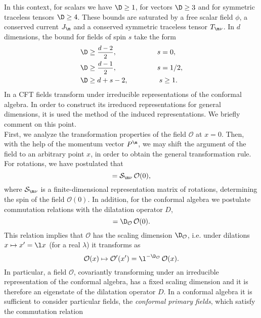 \documentclass[a4paper,11pt,openright,twoside]{book}
\let\n=\nu      \let\x=\xi     \let\p=\pi      \let\r=\rho
\newcommand{\sdfrac}[2]{\mbox{\small$\displaystyle\frac{#1}{#2}$}}
\numberwithin{equation}{section}
\begin{document}
In this context, for scalars we have $\D\ge1$, for vectors $\D\ge3$ and for symmetric traceless tensors $\D\ge4$. These bounds are saturated by a free scalar field $\phi$, a conserved current $J_\m$ and a conserved symmetric traceless tensor $T_{\m\n}$. In $d$ dimensions, the bound for fields of spin $s$ take the form
\begin{align}
	&\D\ge \sdfrac{d-2}{2},\hspace{2cm} s=0,\\
	&\D\ge \sdfrac{d-1}{2},\hspace{2cm} s=1/2,\\
	&\D\ge d+s-2,\hspace{1.53cm} s\ge1.
\end{align}
In a CFT fields transform under irreducible representations of the conformal algebra. In order to construct its irreduced representations for general dimensions, it is used the method of the {induced representations}. We briefly comment on this point.\\
First, we analyze the transformation properties of the field $\mathcal{O}$ at $x=0$. Then, with the help of the momentum vector $P^\m$, we may shift the argument of the field to an arbitrary point $x$, in order to obtain the general transformation rule. For rotations, we have postulated that 
\begin{equation}
	[L_{\m\n},\mathcal{O}(0)]=\mathcal{S}_{\m\n}\,\mathcal{O}(0),
\end{equation}
where $\mathcal{S}_{\m\n}$ is a finite-dimensional representation matrix of rotations, determining the spin of the field $\mathcal{O}(0)$. In addition, for the conformal algebra we postulate commutation relations with the dilatation operator $D$,
\begin{equation}
	[D,\mathcal{O}(0)]=\D_{\mathcal{O}}\,\mathcal{O}(0).
\end{equation}
This relation implies that $\mathcal{O}$ has the scaling dimension $\D_{\mathcal{O}}$, i.e. under dilations $x\mapsto x'=\l x$ (for a real $\lambda$) it transforms as 
\begin{equation}
	\mathcal{O}(x)\mapsto \mathcal{O}'(x')=\l^{-\D_\mathcal{O}}\,\mathcal{O}(x).
\end{equation}
In particular, a field $\mathcal{O}$, covariantly transforming under an irreducible representation of the conformal algebra, has a fixed scaling dimension and it is therefore an eigenstate of the dilatation operator $D$. In a conformal algebra it is sufficient to consider particular fields, the \textit{conformal primary fields}, which satisfy the commutation relation
\end{document}

